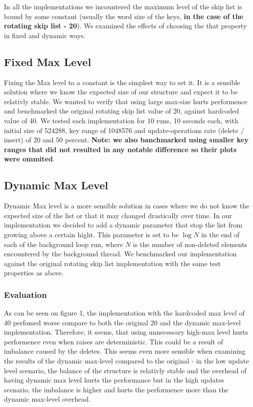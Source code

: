 \documentclass{article}
\begin{document}
In all the implementations we incountered the maximum level of the skip list is bound by some constant (usually the word size of the keys, \textbf{in the case of the rotating skip list - 20}). We examined the effects of choosing the that property in fixed and dynamic ways.

\subsection{Fixed Max Level}
\label{ssec:fml}

Fixing the Max level to a constant is the simplest way to set it. It is a sensible solution where we know the expected size of our structure and expect it to be relativly stable. We wanted to verify that using large max-size hurts performence and benchmarked the original rotating skip list value of 20, against hardcoded value of 40. We tested each implementation for 10 runs, 10 seconds each, with initial size of 524288, key range of 1048576 and update-operations rate (delete / insert) of 20 and 50 percent. \textbf{Note: we also banchmarked using smaller key ranges that did not resulted in any notable difference so their plots were ommited}.

\subsection{Dynamic Max Level}
\label{ssec:dml}

Dynamic Max level is a more sensible solution in cases where we do not know the expected size of the list or that it may changed drastically over time. In our implementation we decided to add a dynamic parameter that stop the list from growing above a certain hight. This parameter is set to be $\log{N}$ in the end of each of the background loop run, where $N$ is the number of non-deleted elements encountered by the background thread. We benchmarked our implementation against the original rotating skip list implementation with the same test properties as above.

\subsubsection{Evaluation}
\label{sssec:ml-evl}

As can be seen on figure 1, the implementation with the hardcoded max level of 40 perfomed worse compare to both the original 20 and the dynamic max-level implementation. Therefore, it seems, that using unnecessary high-max level hurts performence even when raises are deterministic. This could be a result of imbalance caused by the deletes. This seems even more sensible when examining the results of the dynamic max-level compared to the original - in the low update level scenario, the balance of the structure is relativly stable and the overhead of having dynamic max level hurts the performance but in the high updates scenario, the imbalance is higher and hurts the performence more than the dynamic max-level overhead.
\end{document}
